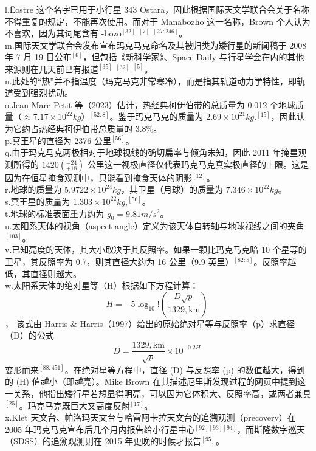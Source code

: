 l.Ēostre 这个名字已用于小行星 343 Ostara，因此根据国际天文学联合会关于名称不得重复的规定，不能再次使用。而对于 Manabozho 这一名称，Brown 个人认为不喜欢，因为其词尾含有 -bozo$^{[32]}$ $^{[7]}$ $^{[27:246]}$。\\
m.国际天文学联合会发布宣布玛克马克命名及其被归类为矮行星的新闻稿于 2008 年 7 月 19 日公布$^{[6]}$，但包括《新科学家》、Space Daily 与行星学会在内的其他来源则在几天前已有报道$^{[35]}$ $^{[32]}$ $^{[5]}$。\\
n.此处的“热”并不指温度（玛克马克非常寒冷），而是指其轨道动力学特性，即轨道受到强烈扰动。\\
o.Jean-Marc Petit 等（2023）估计，热经典柯伊伯带的总质量为 0.012 个地球质量（$\approx7.17\times10^{22}kg$）$^{[52:8]}$。鉴于玛克马克的质量为 $2.69\times 10^{21}kg$.$^{[15]}$，因此认为它约占热经典柯伊伯带总质量的 3.8\%。\\
p.冥王星的直径为 2376 公里$^{[56]}$。\\
q.由于玛克马克两极相对于地球视线的确切扁率与倾角未知，因此 2011 年掩星观测所得的 $1420(_{+18}^{-24})$ 公里这一视极直径仅代表玛克马克真实极直径的上限。这是因为在恒星掩食观测中，只能看到掩食天体的阴影$^{[12]}$。\\
r.地球的质量为 $5.9722\times10^{24}kg$，其卫星（月球）的质量为 $7.346\times10^{22}kg$。\\
s.冥王星的质量为 $1.303\times10^{22}kg$,$^{[56]}$。\\
t.地球的标准表面重力约为 $g_0 = 9.81m/s^2$。\\
u.太阳系天体的视角（aspect angle）定义为该天体自转轴与地球视线之间的夹角$^{[103]}$。\\
v.已知亮度的天体，其大小取决于其反照率。如果一颗比玛克马克暗 10 个星等的卫星，其反照率为 0.7，则其直径大约为 16 公里（9.9 英里）$^{[82:8]}$。反照率越低，其直径则越大。\\
w.太阳系天体的绝对星等（H）根据如下方程计算：
$$H = -5 \log_{10}!\left(\frac{D \sqrt{p}}{1329,\mathrm{km}}\right)~$$，
该式由 Harris & Harris（1997）给出的原始绝对星等与反照率（p）求直径（D）的公式
$$D = \frac{1329,\mathrm{km}}{\sqrt{p}} \times 10^{-0.2H}~$$
变形而来$^{[88:451]}$。在绝对星等方程中，直径 (D) 与反照率 (p) 的数值越大，得到的 (H) 值越小（即越亮）。Mike Brown 在其描述厄里斯发现过程的网页中提到这一关系，他指出矮行星若想显得明亮，可以因为它体积大、反照率高，或两者兼具$^{[25]}$。玛克马克既巨大又高度反射$^{[17]}$。\\
x.Kleť 天文台、帕洛玛天文台与哈雷阿卡拉天文台的追溯观测（precovery）在 2005 年玛克马克宣布后几个月内报告给小行星中心$^{[92][93][94]}$，而斯隆数字巡天（SDSS）的追溯观测则在 2015 年更晚的时候才报告$^{[95]}$。

